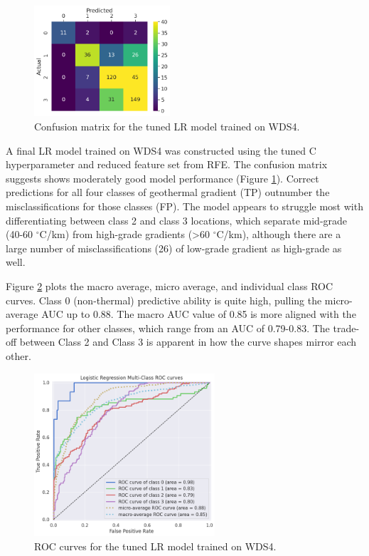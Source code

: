 \begin{figure}
\centering
\includegraphics[width=0.45\textwidth]{templates/images/Figure-LR-ConfusionMatrix.png}
\singlespacing
\caption[Logistic regression confusion matrix]{Confusion matrix for the tuned LR model trained on WDS4.}
\label{fig:logreg_conf_matrix}
\end{figure}
A final LR model trained on WDS4 was constructed using the tuned C hyperparameter and reduced feature set from RFE. The confusion matrix suggests shows moderately good model performance (Figure \ref{fig:logreg_conf_matrix}). Correct predictions for all four classes of geothermal gradient (TP) outnumber the misclassifications for those classes (FP). The model appears to struggle most with differentiating between class 2 and class 3 locations, which separate mid-grade (40-60 $^\circ$C/km) from high-grade gradients (>60 $^\circ$C/km), although there are a large number of misclassifications (26) of low-grade gradient as high-grade as well.

Figure \ref{fig:logreg_auc} plots the macro average, micro average, and individual class ROC curves. Class 0 (non-thermal) predictive ability is quite high, pulling the micro-average AUC up to 0.88.  The macro AUC value of 0.85 is more aligned with the performance for other classes, which range from an AUC of 0.79-0.83. The trade-off between Class 2 and Class 3 is apparent in how the curve shapes mirror each other.

\begin{figure}[!htp]
\centering
\includegraphics[width=0.6\textwidth]{templates/images/Figure-LR-AUC.png}
\singlespacing
\caption[Logistic regression ROC curves]{ROC curves for the tuned LR model trained on WDS4.}
\label{fig:logreg_auc}
\end{figure}

